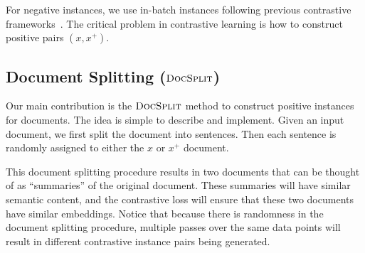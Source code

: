 \documentclass[11pt]{article}
\newcommand{\our}{\mbox{\textsc{DocSplit}}}
\begin{document}

For negative instances, we use in-batch instances following previous contrastive frameworks~\cite{Gao2021SimCSESC, Li2022UCTopicUC}.
The critical problem in contrastive learning is how to construct positive pairs $(x, x^{+})$.

\subsection{Document Splitting ($\our$)}
Our main contribution is the $\our$ method to construct positive instances for documents. 
The idea is simple to describe and implement.
Given an input document, we first split the document into sentences.
Then each sentence is randomly assigned to either the $x$ or $x^+$ document.

This document splitting procedure results in two documents that can be thought of as ``summaries'' of the original document.
These summaries will have similar semantic content,
and the contrastive loss will ensure that these two documents have similar embeddings.
Notice that because there is randomness in the document splitting procedure,
multiple passes over the same data points will result in different contrastive instance pairs being generated.

\end{document}

